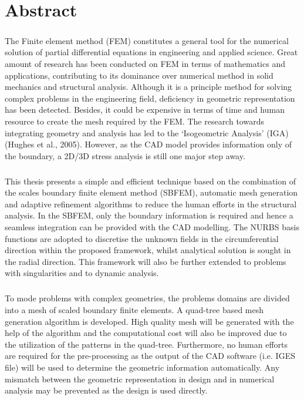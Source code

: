 \chapter*{Abstract}
\paragraph{}
The Finite element method (FEM) constitutes a general tool for the numerical solution of partial differential equations in engineering and applied science.
Great amount of research has been conducted on FEM in terms of mathematics and applications, contributing to its dominance over numerical method in solid mechanics and structural analysis.
Although it is a principle method for solving complex problems in the engineering field, deficiency in geometric representation has been detected.
Besides, it could be expensive in terms of time and human resource to create the mesh required by the FEM.
The research towards integrating geometry and analysis has led to the ‘Isogeometric Analysis’ (IGA) (Hughes et al., 2005).
However, as the CAD model provides information only of the boundary, a 2D/3D stress analysis is still one major step away.

\paragraph{}
This thesis presents a simple and efficient technique based on the combination of the scales boundary finite element method (SBFEM), automatic mesh generation and adaptive refinement algorithms to reduce the human efforts in the structural analysis.
In the SBFEM, only the boundary information is required and hence a seamless integration can be provided with the CAD modelling.
The NURBS basis functions are adopted to discretise the unknown fields in the circumferential direction within the proposed framework, whilst analytical solution is sought in the radial direction.
This framework will also be further extended to problems with singularities and to dynamic analysis.

\paragraph{}
To mode problems with complex geometries, the problems domains are divided into a mesh of scaled boundary finite elements.
A quad-tree based mesh generation algorithm is developed. High quality mesh will be generated with the help of the algorithm and the computational cost will also be improved due to the utilization of the patterns in the quad-tree.
Furthermore, no human efforts are required for the pre-processing as the output of the CAD software (i.e. IGES file) will be used to determine the geometric information automatically.
Any mismatch between the geometric representation in design and in numerical analysis may be prevented as the design is used directly.


